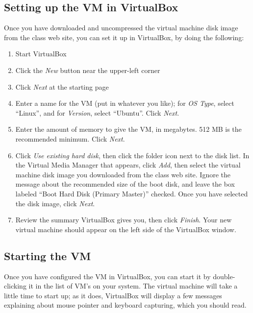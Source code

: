\documentclass[letterpaper,10pt,english]{sphinxmanual}
\begin{document}
\subsection{Setting up the VM in VirtualBox}
\label{vm:setting-up-the-vm-in-virtualbox}
Once you have downloaded and uncompressed the virtual machine disk
image from the class web site, you can set it up in VirtualBox, by
doing the following:
\begin{enumerate}
\item {} 
Start VirtualBox

\item {} 
Click the \emph{New} button near the upper-left corner

\item {} 
Click \emph{Next} at the starting page

\item {} 
Enter a name for the VM (put in whatever you like); for \emph{OS Type},
select ``Linux'', and for \emph{Version}, select ``Ubuntu''.  Click \emph{Next}.

\item {} 
Enter the amount of memory to give the VM, in megabytes.
512 MB is the recommended minimum.  Click \emph{Next}.

\item {} 
Click \emph{Use existing hard disk}, then click the folder icon next to
the disk list.  In the Virtual Media Manager that appears, click
\emph{Add}, then select the virtual machine disk image you downloaded
from the class web site.  Ignore the message about the recommended
size of the boot disk, and leave the box labeled ``Boot Hard Disk
(Primary Master)'' checked.  Once you have selected the disk image,
click \emph{Next}.

\item {} 
Review the summary VirtualBox gives you, then click \emph{Finish}.  Your
new virtual machine should appear on the left side of the VirtualBox
window.

\end{enumerate}


\subsection{Starting the VM}
\label{vm:starting-the-vm}
Once you have configured the VM in VirtualBox, you can start it by
double-clicking it in the list of VM's on your system.  The virtual
machine will take a little time to start up; as it does, VirtualBox
will display a few messages explaining about mouse pointer and
keyboard capturing, which you should read.
\end{document}
